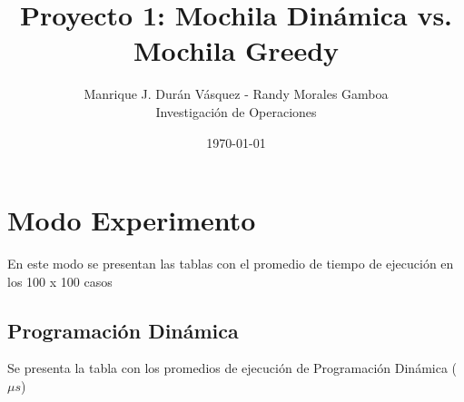 \documentclass[12pt]{article}
\title{Proyecto 1: Mochila Din\'amica vs. Mochila Greedy}
\author{Manrique J. Dur\'an V\'asquez - Randy Morales Gamboa\\Investigaci\'on de Operaciones\\}
\date{\today}
\begin{document}
\maketitle
\oddsidemargin=5pt
\pagebreak

\section*{Modo Experimento}
En este modo se presentan las tablas con el promedio de tiempo de ejecuci\'on en los 100 x 100 casos\\
\subsection*{Programaci\'on Din\'amica}
Se presenta la tabla con los promedios de ejecuci\'on de Programaci\'on Din\'amica ($\mu s$)\\
\end{document}
